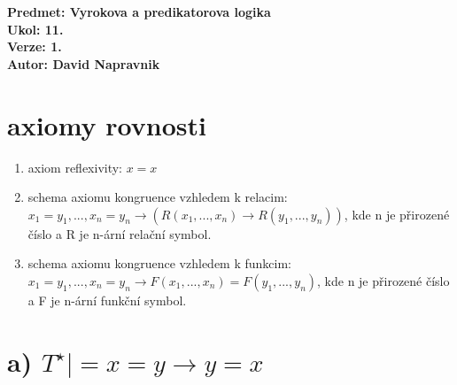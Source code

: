 \documentclass[a4paper]{article}
\begin{document}
\noindent
\textbf{Predmet: Vyrokova a predikatorova logika}\\
\textbf{Ukol: 11.}\\
\textbf{Verze: 1.}\\
\textbf{Autor: David Napravnik}



\section*{axiomy rovnosti}
\renewcommand{\labelenumi}{\roman{enumi}}
\begin{enumerate}
    \item axiom reflexivity: 
        $x=x$
    \item schema axiomu kongruence vzhledem k relacim: $
        x_{1} = y_{1},...,x_{n}=y_{n}
        \rightarrow
        (R(x_{1},...,x_{n})
        \rightarrow
        R(y_{1},...,y_{n}))
        $, kde n je přirozené číslo a R je n-ární relační symbol.
    \item schema axiomu kongruence vzhledem k funkcim: $
        x_{1}=y_{1},...,x_{n}=y_{n}
        \rightarrow
        F(x_{1},...,x_{n})=F(y_{1},...,y_{n})
        $, kde n je přirozené číslo a F je n-ární funkční symbol.
\end{enumerate}


\section*{a)  $T^\star |= x = y \rightarrow y = x$}
\end{document}
